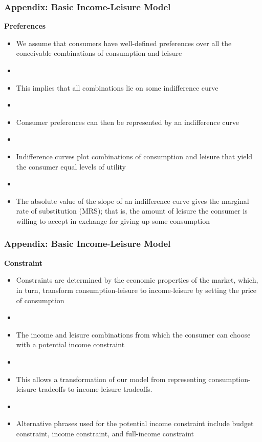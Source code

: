 \documentclass[blue]{beamer}
\begin{document}
 
 \begin{frame} \frametitle{Appendix: Basic Income-Leisure Model}
\textbf{Preferences}\\
\begin{itemize}


 \item We assume that consumers have well-defined preferences over all the conceivable combinations of consumption and leisure
 \item[]
  \item This implies that all combinations lie on some indifference curve
   \item[]
  \item Consumer preferences can then be represented by an indifference curve
   \item[]
  \item Indifference curves plot combinations of consumption and leisure that yield the consumer equal levels of utility
   \item[]
  \item The absolute value of the slope of an indifference curve gives the marginal rate of substitution (MRS); that is, the amount of leisure the consumer is willing to accept in exchange for giving up some consumption
\end{itemize}
 \end{frame}


 \begin{frame} \frametitle{Appendix: Basic Income-Leisure Model}
\textbf{Constraint}\\
\begin{itemize}


 \item  Constraints are determined by the economic properties of the market, which, in turn, transform consumption-leisure to income-leisure by setting the price of consumption
 \item[]
  \item The income and leisure combinations from which the consumer can choose with a potential income constraint
   \item[]
  \item This allows a transformation of our model from representing consumption-leisure tradeoffs to income-leisure tradeoffs.
   \item[]
  \item Alternative phrases used for the potential income constraint include budget constraint, income constraint, and full-income constraint
  
\end{itemize}
 \end{frame}
 
\end{document}

